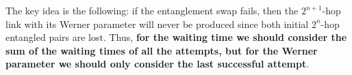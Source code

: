 \documentclass{masterthesis}
\begin{document}







The key idea 
is the following: if the entanglement swap fails, then the $2^{n+1}$-hop link with its Werner parameter will never be produced since both initial $2^{n}$-hop entangled pairs are lost. Thus, \textbf{for the waiting time we should consider the sum of the waiting times of all the attempts, but for the Werner parameter we should only consider the last successful attempt}.
\end{document}
